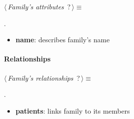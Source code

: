 	\begin{flushleft} \small
\begin{minipage}{\linewidth}\label{scrap15}\raggedright\small
{} $\langle\,${\itshape {Family's attributes}}\nobreak\ {\footnotesize {?}}$\,\rangle\equiv$
\vspace{-1ex}
\begin{list}{}{} \item

                
        {\NWsep}
\end{list}
\vspace{-1.5ex}
\footnotesize
\begin{list}{}{\setlength{\itemsep}{-\parsep}\setlength{\itemindent}{-\leftmargin}}
\item {\NWtxtMacroNoRef}.

\item{}
\end{list}
\end{minipage}\vspace{4ex}
\end{flushleft}
\begin{itemize}
 	\item \textbf{name}: describes family's name
\end{itemize}

\paragraph{Relationships} 

	\begin{flushleft} \small
\begin{minipage}{\linewidth}\label{scrap16}\raggedright\small
{} $\langle\,${\itshape {Family's relationships}}\nobreak\ {\footnotesize {?}}$\,\rangle\equiv$
\vspace{-1ex}
\begin{list}{}{} \item

                
        {\NWsep}
\end{list}
\vspace{-1.5ex}
\footnotesize
\begin{list}{}{\setlength{\itemsep}{-\parsep}\setlength{\itemindent}{-\leftmargin}}
\item {\NWtxtMacroNoRef}.

\item{}
\end{list}
\end{minipage}\vspace{4ex}
\end{flushleft}
\begin{itemize}
 	\item \textbf{patients}: links family to its members
\end{itemize}



